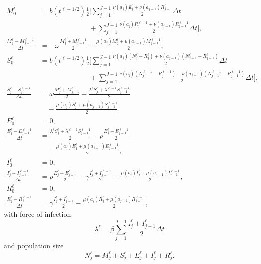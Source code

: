 \documentclass{jpmarticle}
\begin{document}
\begin{equation}
  \begin{split}
    M_0^{\ell} &=
    b(t^{\ell - 1 / 2})
    \frac{1}{2}
    \Bigg[
    \sum_{j = 1}^{J - 1}
    \frac{\nu(a_j) R_j^{\ell} + \nu(a_{j - 1}) R_{j - 1}^{\ell}}{2}
    \Delta t
    \\ & \quad\quad\quad\quad\quad\quad\quad {}
    + \sum_{j = 1}^{J - 1}
    \frac{\nu(a_j) R_j^{\ell - 1} + \nu(a_{j - 1}) R_{j - 1}^{\ell - 1}}{2}
    \Delta t
    \Bigg],
    \\
    \frac{M_j^{\ell} - M_{j - 1}^{\ell - 1}}{\Delta t} &=
    - \omega \frac{M_j^{\ell} + M_{j - 1}^{\ell - 1}}{2}
    - \frac{\mu(a_j) M_j^{\ell} + \mu(a_{j - 1}) M_{j - 1}^{\ell - 1}}{2},
    \\
    S_0^{\ell} &=
    b(t^{\ell - 1 / 2})
    \frac{1}{2}
    \Bigg[
    \sum_{j = 1}^{J - 1}
    \frac{\nu(a_j) (N_j^{\ell} - R_j^{\ell})
      + \nu(a_{j - 1}) (N_{j - 1}^{\ell} - R_{j - 1}^{\ell})}
    {2}
    \Delta t
    \\ & \quad\quad\quad\quad\quad\quad\quad {}
    + \sum_{j = 1}^{J - 1}
    \frac{\nu(a_j) (N_j^{\ell - 1} - R_j^{\ell - 1})
      + \nu(a_{j - 1}) (N_{j - 1}^{\ell - 1} - R_{j - 1}^{\ell - 1})}
    {2}
    \Delta t
    \Bigg],
    \\
    \frac{S_j^{\ell} - S_j^{\ell - 1}}{\Delta t} &=
    \omega \frac{M_j^{\ell} + M_{j - 1}^{\ell}}{2}
    - \frac{\lambda^{\ell} S_j^{\ell} + \lambda^{\ell - 1} S_{j - 1}^{\ell - 1}}{2}
    \\ & \quad {}
    - \frac{\mu(a_j) S_j^{\ell} + \mu(a_{j - 1}) S_{j - 1}^{\ell - 1}}{2},
    \\
    E_0^{\ell} &= 0,
    \\
    \frac{E_j^{\ell} - E_{j - 1}^{\ell - 1}}{\Delta t} &=
    \frac{\lambda^{\ell} S_j^{\ell} + \lambda^{\ell - 1} S_{j - 1}^{\ell - 1}}{2}
    - \rho \frac{E_j^{\ell} + E_{j - 1}^{\ell - 1}}{2}
    \\ & \quad {}
    - \frac{\mu(a_j) E_j^{\ell} + \mu(a_{j - 1}) E_{j - 1}^{\ell - 1}}{2},
    \\
    I_0^{\ell} &= 0,
    \\
    \frac{I_j^{\ell} - I_{j - 1}^{\ell - 1}}{\Delta t} &=
    \rho \frac{E_j^{\ell} + E_{j - 1}^{\ell}}{2}
    - \gamma \frac{I_j^{\ell} + I_{j - 1}^{\ell - 1}}{2}
    - \frac{\mu(a_j) I_j^{\ell} + \mu(a_{j - 1}) I_{j - 1}^{\ell - 1}}{2},
    \\
    R_0^{\ell} &= 0,
    \\
    \frac{R_j^{\ell} - R_j^{\ell - 1}}{\Delta t} &=
    \gamma \frac{I_j^{\ell} + I_{j - 1}^{\ell}}{2}
    - \frac{\mu(a_j) R_j^{\ell} + \mu(a_{j - 1}) R_{j - 1}^{\ell - 1}}{2},
  \end{split}
\end{equation}
with force of infection
\begin{equation}
  \lambda^{\ell} =
  \beta \sum_{j = 1}^{J - 1}
  \frac{I_j^{\ell} + I_{j - 1}^{\ell}}{2}
  \Delta t
\end{equation}
and population size
\begin{equation}
  N_j^{\ell} =
  M_j^{\ell} + S_j^{\ell} + E_j^{\ell} + I_j^{\ell} + R_j^{\ell}.
\end{equation}
\end{document}
